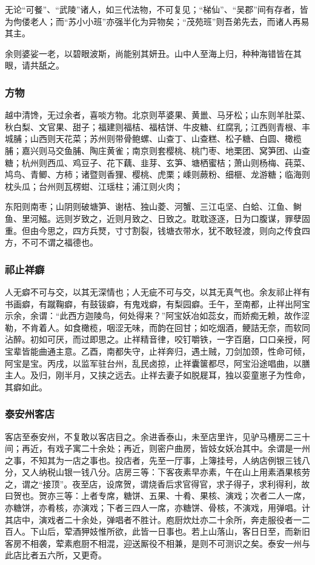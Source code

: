 \documentclass[]{article}
\begin{document}
无论``可餐''、``武陵''诸人，如三代法物，不可复见；``梯仙''、``吴郡''间有存者，皆为佝偻老人；而``苏小小班''亦强半化为异物矣；``茂苑班''则吾弟先去，而诸人再易其主。

余则婆娑一老，以碧眼波斯，尚能别其妍丑。山中人至海上归，种种海错皆在其眼，请共舐之。

\hypertarget{header-n337}{%
\subsubsection{方物}\label{header-n337}}

越中清馋，无过余者，喜啖方物。北京则苹婆果、黄巤、马牙松；山东则羊肚菜、秋白梨、文官果、甜子；福建则福桔、福桔饼、牛皮糖、红腐乳；江西则青根、丰城脯；山西则天花菜；苏州则带骨鲍螺、山查丁、山查糕、松子糖、白圆、橄榄脯；嘉兴则马交鱼脯、陶庄黄雀；南京则套樱桃、桃门枣、地栗团、窝笋团、山查糖；杭州则西瓜、鸡豆子、花下藕、韭芽、玄笋、塘栖蜜桔；萧山则杨梅、莼菜、鸠鸟、青鲫、方柿；诸暨则香狸、樱桃、虎栗；嵊则蕨粉、细榧、龙游糖；临海则枕头瓜；台州则瓦楞蚶、江瑶柱；浦江则火肉；

东阳则南枣；山阴则破塘笋、谢桔、独山菱、河蟹、三江屯坚、白蛤、江鱼、鲥鱼、里河鰦。远则岁致之，近则月致之、日致之。耽耽逐逐，日为口腹谋，罪孽固重。但由今思之，四方兵燹，寸寸割裂，钱塘衣带水，犹不敢轻渡，则向之传食四方，不可不谓之福德也。

\hypertarget{header-n342}{%
\subsubsection{祁止祥癖}\label{header-n342}}

人无癖不可与交，以其无深情也；人无疵不可与交，以其无真气也。余友祁止祥有书画癖，有蹴鞠癖，有鼓钹癖，有鬼戏癖，有梨园癖。壬午，至南都，止祥出阿宝示余，余谓：``此西方迦陵鸟，何处得来？''阿宝妖冶如蕊女，而娇痴无赖，故作涩勒，不肯着人。如食橄榄，咽涩无味，而韵在回甘；如吃烟酒，鲠詰无奈，而软同沾醉。初如可厌，而过即思之。止祥精音律，咬钉嚼铁，一字百磨，口口亲授，阿宝辈皆能曲通主意。乙酉，南都失守，止祥奔归，遇土贼，刀剑加颈，性命可倾，阿宝是宝。丙戌，以监军驻台州，乱民卤掠，止祥囊箧都尽，阿宝沿途唱曲，以膳主人。及归，刚半月，又挟之远去。止祥去妻子如脱屣耳，独以娈童崽子为性命，其癖如此。

\hypertarget{header-n347}{%
\subsubsection{泰安州客店}\label{header-n347}}

客店至泰安州，不复敢以客店目之。余进香泰山，未至店里许，见驴马槽房二三十间；再近，有戏子寓二十余处；再近，则密户曲房，皆妓女妖冶其中。余谓是一州之事，不知其为一店之事也。投店者，先至一厅事，上簿挂号，人纳店例银三钱八分，又人纳税山银一钱八分。店房三等：下客夜素早亦素，午在山上用素酒果核劳之，谓之``接顶''。夜至店，设席贺，谓烧香后求官得官，求子得子，求利得利，故曰贺也。贺亦三等：上者专席，糖饼、五果、十肴、果核、演戏；次者二人一席，亦糖饼，亦肴核，亦演戏；下者三四人一席，亦糖饼、骨核，不演戏，用弹唱。计其店中，演戏者二十余处，弹唱者不胜计。庖厨炊灶亦二十余所，奔走服役者一二百人。下山后，荤酒狎妓惟所欲，此皆一日事也。若上山落山，客日日至，而新旧客房不相袭，荤素庖厨不相混，迎送厮役不相兼，是则不可测识之矣。泰安一州与此店比者五六所，又更奇。
\end{document}
